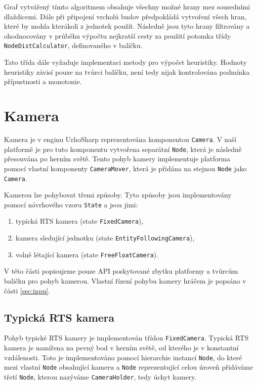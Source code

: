 Graf vytvářený tímto algoritmem obsahuje všechny možné hrany mez sousedními dlaždicemi. Dále při připojení vrcholů budov předpokládá vytvoření všech hran, které by mohla kterákoli z jednotek použít. Následně jsou tyto hrany filtrovány a ohodnocovány v průběhu výpočtu nejkratší cesty za použití potomka třídy \texttt{NodeDistCalculator}, definovaného v balíčku. 

Tato třída dále vyžaduje implementaci metody pro výpočet heuristiky. Hodnoty heuristiky závisí pouze na tvůrci balíčku, není tedy nijak kontrolována podmínka přípustnosti a monotonie.

\section{Kamera}
\label{sec:camera}
Kamera je v enginu UrhoSharp reprezentována komponentou \texttt{Camera}. V naší platformě je pro tuto komponentu vytvořena separátní \texttt{Node}, která je následně přesouvána po herním světě. Tento pohyb kamery implementuje platforma pomocí vlastní komponenty \texttt{CameraMover}, která je přidána na stejnou \texttt{Node} jako \texttt{Camera}.

Kamerou lze pohybovat třemi způsoby. Tyto způsoby jsou implementovány pomocí návrhového vzoru \texttt{State} a jsou jimi:
\begin{enumerate}
	\item typická RTS kamera (state \texttt{FixedCamera}),
	\item kamera sledující jednotku (state \texttt{EntityFollowingCamera}),
	\item volně létající kamera (state \texttt{FreeFloatCamera}).

\end{enumerate}

V této části popisujeme pouze API poskytované zbytku platformy a tvůrcům baličku pro pohyb kamerou. Vlastní řízení pohybu kamery hráčem je popsáno v části \ref{sec:inpu}.

\subsection{Typická RTS kamera}
Pohyb typické RTS kamery je implementován třídou \texttt{FixedCamera}. Typická RTS kamera je namířena na pevný bod v herním světě, od kterého je v konstantní vzdálenosti. Toto je implementováno pomocí hierarchie instancí \texttt{Node}, do které mezi vlastní \texttt{Node} obsahující kameru a \texttt{Node} reprezentující celou úroveň přidáváme třetí \texttt{Node}, kterou nazýváme \texttt{CameraHolder}, tedy úchyt kamery. 


